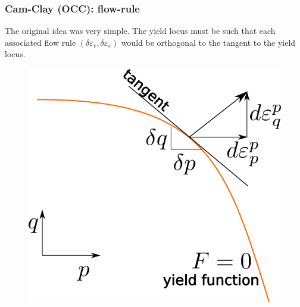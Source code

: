 \documentclass[notes]{beamer}
\begin{document}
\begin{frame}
\frametitle{Cam-Clay (OCC): flow-rule}
The original idea was very simple. The yield locus must be such that each associated flow rule $(\delta \varepsilon_v, \delta \varepsilon_s)$ would be orthogonal to the tangent to the yield locus.

\noindent
\fboxsep=0pt
\noindent
\begin{minipage}[t]{0.65\linewidth}
	
\end{minipage}%
\hfill
\begin{minipage}[t]{0.35\linewidth}
	\begin{figure}
		\includegraphics[width=\textwidth]{figs/flow-rule.png}
	\end{figure}
\end{minipage}
\end{frame}
\end{document}
